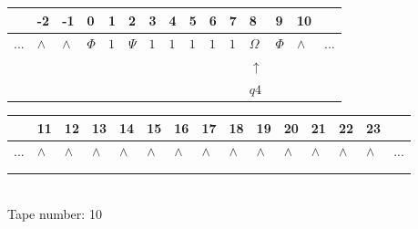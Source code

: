 \documentclass[11pt]{article}
\begin{document}
\begin{table}[H]
\centering
\begin{tabular}{lllllllllllllll}
 & -2 & -1 & 0 & 1 & 2 & 3 & 4 & 5 & 6 & 7 & 8 & 9 & 10 & \\
\hline
$...$ & \multicolumn{1}{|l|}{$\wedge$} & \multicolumn{1}{|l|}{$\wedge$} & \multicolumn{1}{|l|}{$\Phi$} & \multicolumn{1}{|l|}{$1$} & \multicolumn{1}{|l|}{$\Psi$} & \multicolumn{1}{|l|}{$1$} & \multicolumn{1}{|l|}{$1$} & \multicolumn{1}{|l|}{$1$} & \multicolumn{1}{|l|}{$1$} & \multicolumn{1}{|l|}{$1$} & \multicolumn{1}{|l|}{$\Omega$} & \multicolumn{1}{|l|}{$\Phi$} & \multicolumn{1}{|l|}{$\wedge$} & $...$\\
\hline
&  &  &  &  &  &  &  &  &  &  & $\uparrow$ &  &  &  \\
&  &  &  &  &  &  &  &  &  &  & $ q4 $ &  &  &  \\
\end{tabular}
\begin{tabular}{lllllllllllllll}
 & 11 & 12 & 13 & 14 & 15 & 16 & 17 & 18 & 19 & 20 & 21 & 22 & 23 & \\
\hline
$...$ & \multicolumn{1}{|l|}{$\wedge$} & \multicolumn{1}{|l|}{$\wedge$} & \multicolumn{1}{|l|}{$\wedge$} & \multicolumn{1}{|l|}{$\wedge$} & \multicolumn{1}{|l|}{$\wedge$} & \multicolumn{1}{|l|}{$\wedge$} & \multicolumn{1}{|l|}{$\wedge$} & \multicolumn{1}{|l|}{$\wedge$} & \multicolumn{1}{|l|}{$\wedge$} & \multicolumn{1}{|l|}{$\wedge$} & \multicolumn{1}{|l|}{$\wedge$} & \multicolumn{1}{|l|}{$\wedge$} & \multicolumn{1}{|l|}{$\wedge$} & $...$\\
\hline
&  &  &  &  &  &  &  &  &  &  &  &  &  &  \\
&  &  &  &  &  &  &  &  &  &  &  &  &  &  \\
\end{tabular}
\\
Tape number: 10
\noindent\makebox[\linewidth]{\hdashrule{\textwidth}{1pt}{1pt}}\end{table}
\end{document}
